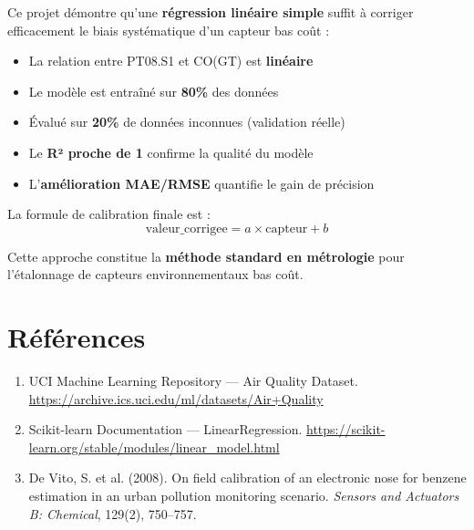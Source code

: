 \documentclass[12pt, a4paper]{article}
\begin{document}
Ce projet démontre qu'une \textbf{régression linéaire simple} suffit à corriger 
efficacement le biais systématique d'un capteur bas coût :

\begin{itemize}
    \item La relation entre PT08.S1 et CO(GT) est \textbf{linéaire}
    \item Le modèle est entraîné sur \textbf{80\%} des données
    \item Évalué sur \textbf{20\%} de données inconnues (validation réelle)
    \item Le \textbf{R² proche de 1} confirme la qualité du modèle
    \item L'\textbf{amélioration MAE/RMSE} quantifie le gain de précision
\end{itemize}

\vspace{0.5cm}
\noindent La formule de calibration finale est :
\begin{equation}
    \text{valeur\_corrigee} = a \times \text{capteur} + b
\end{equation}

\vspace{1cm}
\noindent Cette approche constitue la \textbf{méthode standard en métrologie} 
pour l'étalonnage de capteurs environnementaux bas coût.

\newpage
\section*{Références}

\begin{enumerate}
    \item UCI Machine Learning Repository — Air Quality Dataset. 
          \url{https://archive.ics.uci.edu/ml/datasets/Air+Quality}
    \item Scikit-learn Documentation — LinearRegression. 
          \url{https://scikit-learn.org/stable/modules/linear_model.html}
    \item De Vito, S. et al. (2008). On field calibration of an electronic nose 
          for benzene estimation in an urban pollution monitoring scenario. 
          \textit{Sensors and Actuators B: Chemical}, 129(2), 750--757.
\end{enumerate}
\end{document}
